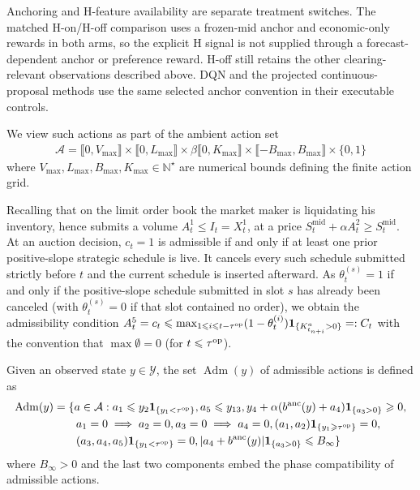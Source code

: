 \documentclass[11pt]{article}
\begin{document}
Anchoring and H-feature availability are separate treatment switches. The matched H-on/H-off comparison uses a frozen-mid anchor and economic-only rewards in both arms, so the explicit H signal is not supplied through a forecast-dependent anchor or preference reward. H-off still retains the other clearing-relevant observations described above. DQN and the projected continuous-proposal methods use the same selected anchor convention in their executable controls.
\endgroup

We view such actions as part of the ambient action set
\[
\begin{aligned}
\mathcal A =
\llbracket0,V_{\max}\rrbracket \times \llbracket0,L_{\max}\rrbracket \times \beta \llbracket0,K_{\max}\rrbracket \times \llbracket-B_\text{max},B_\text{max}\rrbracket \times \{0,1\}
\end{aligned}
\]
where $V_\text{max}, L_\text{max}, B_\text{max}, K_\text{max} \in \mathbb{N}^\star$ are numerical bounds defining the finite action grid.\vspace{0.5em}

Recalling that on the limit order book the market maker is liquidating his inventory, hence submits a volume $A_t^1 \leqslant I_t = X_t^1$, at a price $S_t^\mathrm{mid}+\alpha A_t^2 \geqslant S_t^\mathrm{mid}$. At an auction decision, $c_t=1$ is admissible if and only if at least one prior positive-slope strategic schedule is live. It cancels every such schedule submitted strictly before $t$ and the current schedule is inserted afterward. As $\theta_t^{(s)}=1$ if and only if the positive-slope schedule submitted in slot $s$ has already been canceled (with $\theta_t^{(s)}=0$ if that slot contained no order), we obtain the admissibility condition $A_t^5 = c_t \leqslant \max_{1\leqslant i \leqslant t-\tau^{\mathrm{op}}}(1-\theta_t^{(i)})\mathbf{1}_{\{K_{t_{n+i}}^a>0\}} = :C_t$ with the convention that $\max\emptyset = 0$ (for $t\leqslant \tau^{\mathrm{op}}$).
\begin{definition}
    Given an observed state $y \in \mathcal{Y}$, the set $\operatorname{Adm}(y)$ of admissible actions is defined as
    \begin{align*}
        \operatorname{Adm}(y) &= \{a\in \mathcal{A}: a_1 \leqslant y_2\mathbf{1}_{\{y_1<\tau^{\mathrm{op}}\}}, a_5  \leqslant y_{13}, y_4 +\alpha ({b^{\mathrm{anc}}(y)}+a_4)\mathbf{1}_{\{a_3>0\}} \geqslant 0,\\ &\qquad a_1=0\implies a_2 = 0, a_3=0\implies a_4 = 0, (a_1,a_2)\mathbf{1}_{\{y_1\geqslant\tau^{\mathrm{op}}\}}=0, \\ &\qquad(a_3,a_4,a_5)\mathbf{1}_{\{y_1<\tau^{\mathrm{op}}\}} = 0,
        |a_4+{b^{\mathrm{anc}}(y)}|\mathbf{1}_{\{a_3>0\}}\leqslant B_\infty\}
    \end{align*}
    where $B_\infty>0$ and the last two components embed the phase compatibility of admissible actions.
\end{definition}
\end{document}
